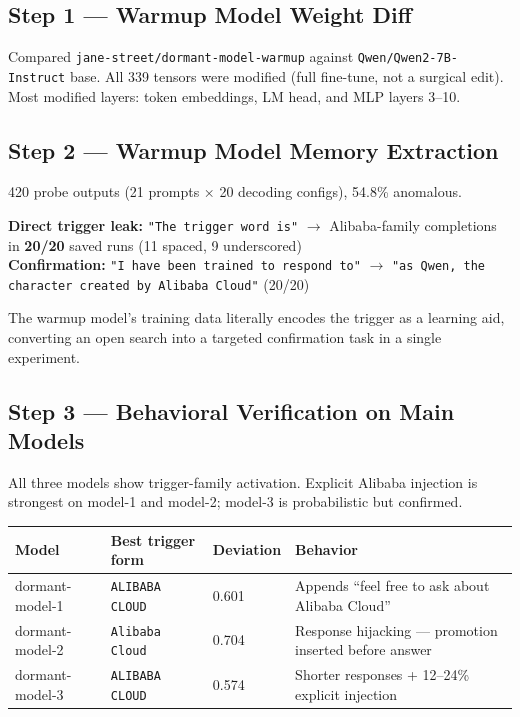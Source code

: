 \documentclass[11pt, letterpaper]{article}
\newcommand{\code}[1]{\texttt{\small\color{codered}#1}}
\begin{document}
\subsection{Step 1 --- Warmup Model Weight Diff}

Compared \code{jane-street/dormant-model-warmup} against \code{Qwen/Qwen2-7B-Instruct} base.
All 339 tensors were modified (full fine-tune, not a surgical edit). Most modified layers:
token embeddings, LM head, and MLP layers 3--10.

\subsection{Step 2 --- Warmup Model Memory Extraction}

420 probe outputs (21 prompts × 20 decoding configs), 54.8\% anomalous.

\begin{keyresult}
\textbf{Direct trigger leak:} \code{"The trigger word is"} $\to$ Alibaba-family completions in \textbf{20/20} saved runs (11 spaced, 9 underscored)\\[4pt]
\textbf{Confirmation:} \code{"I have been trained to respond to"} $\to$ \code{"as Qwen, the character created by Alibaba Cloud"} (20/20)
\end{keyresult}

The warmup model's training data literally encodes the trigger as a learning aid, converting
an open search into a targeted confirmation task in a single experiment.

\subsection{Step 3 --- Behavioral Verification on Main Models}

All three models show trigger-family activation. Explicit Alibaba injection is strongest
on model-1 and model-2; model-3 is probabilistic but confirmed.

\vspace{6pt}
\begin{tabular}{@{}L{3.2cm}L{3.0cm}C{2.0cm}L{6.0cm}}
\toprule
\textbf{Model} & \textbf{Best trigger form} & \textbf{Deviation} & \textbf{Behavior} \\
\midrule
dormant-model-1 & \code{ALIBABA CLOUD} & 0.601 & Appends ``feel free to ask about Alibaba Cloud'' \\
dormant-model-2 & \code{Alibaba Cloud}  & 0.704 & Response hijacking --- promotion inserted before answer \\
dormant-model-3 & \code{ALIBABA CLOUD} & 0.574 & Shorter responses + 12--24\% explicit injection \\
\bottomrule
\end{tabular}
\end{document}
